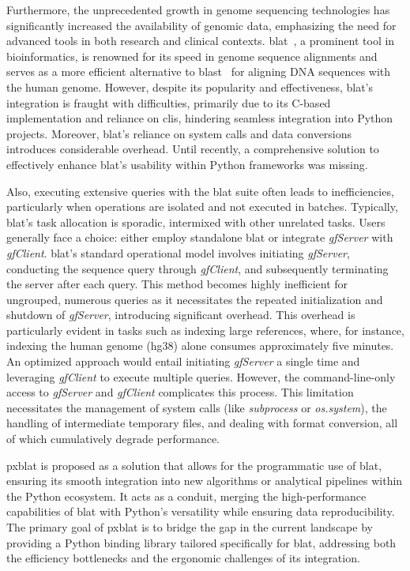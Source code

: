 \documentclass[10pt,letterpaper]{article}
\begin{document}
Furthermore, the unprecedented growth in genome sequencing technologies has significantly increased the availability of genomic data, emphasizing the need for advanced tools in both research and clinical contexts.
\gls{blat}~\cite{kent2002blat}, a prominent tool in bioinformatics, is renowned for its speed in genome sequence alignments and serves as a more efficient alternative to \gls{blast}~\cite{altschul1990basic} for aligning DNA sequences with the human genome.
However, despite its popularity and effectiveness, \gls{blat}'s integration is fraught with difficulties, primarily due to its C-based implementation and reliance on \glspl{cli}, hindering seamless integration into Python projects.
Moreover, \gls{blat}'s reliance on system calls and data conversions introduces considerable overhead.
Until recently, a comprehensive solution to effectively enhance  \gls{blat}'s usability within Python frameworks was missing.

Also, executing extensive queries with the \gls{blat} suite often leads to inefficiencies, particularly when operations are isolated and not executed in batches.
Typically, \gls{blat}'s task allocation is sporadic, intermixed with other unrelated tasks.
Users generally face a choice: either employ standalone \gls{blat} or integrate \emph{gfServer} with \emph{gfClient}.
\gls{blat}'s standard operational model involves initiating \emph{gfServer}, conducting the sequence query through \emph{gfClient}, and subsequently terminating the server after each query.
This method becomes highly inefficient for ungrouped, numerous queries as it necessitates the repeated initialization and shutdown of \emph{gfServer}, introducing significant overhead.
This overhead is particularly evident in tasks such as indexing large references, where, for instance, indexing the human genome (hg38) alone consumes approximately five minutes.
An optimized approach would entail initiating \emph{gfServer} a single time and leveraging \emph{gfClient} to execute multiple queries.
However, the command-line-only access to \emph{gfServer} and \emph{gfClient} complicates this process.
This limitation necessitates the management of system calls (like \emph{subprocess} or \emph{os.system}), the handling of intermediate temporary files, and dealing with format conversion, all of which cumulatively degrade performance.

\gls{pxblat} is proposed as a solution that allows for the programmatic use of \gls{blat}, ensuring its smooth integration into new algorithms or analytical pipelines within the Python ecosystem.
It acts as a conduit, merging the high-performance capabilities of \gls{blat} with Python's versatility while ensuring data reproducibility.
The primary goal of \gls{pxblat} is to bridge the gap in the current landscape by providing a Python binding library tailored specifically for \gls{blat}, addressing both the efficiency bottlenecks and the ergonomic challenges of its integration.
\end{document}
